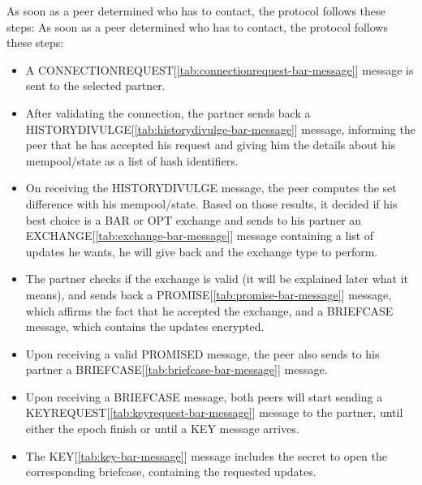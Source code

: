 \documentclass[mscthesis]{usiinfthesis}
\begin{document}
As soon as a peer determined who has to contact, the protocol follows these steps:
As soon as a peer determined who has to contact, the protocol follows these steps:
\begin{itemize}
	\item A CONNECTIONREQUEST[\ref{tab:connectionrequest-bar-message}] message is sent to the selected partner.
	\item After validating the connection, the partner sends back a HISTORYDIVULGE[\ref{tab:historydivulge-bar-message}] message, informing the peer that he has accepted his request and giving him the details about his mempool/state as a list of hash identifiers.
	\item On receiving the HISTORYDIVULGE message, the peer computes the set difference with his mempool/state. Based on those results, it decided if his best choice is a BAR or OPT exchange and sends to his partner an EXCHANGE[\ref{tab:exchange-bar-message}] message containing a list of updates he wants, he will give back and the exchange type to perform.
	\item The partner checks if the exchange is valid (it will be explained later what it means), and sends back a PROMISE[\ref{tab:promise-bar-message}] message, which affirms the fact that he accepted the exchange, and a BRIEFCASE message, which contains the updates encrypted.
	\item Upon receiving a valid PROMISED message, the peer also sends to his partner a BRIEFCASE[\ref{tab:briefcase-bar-message}] message.
	\item Upon receiving a BRIEFCASE message, both peers will start sending a KEYREQUEST[\ref{tab:keyrequest-bar-message}] message to the partner, until either the epoch finish or until a KEY message arrives.
	\item The KEY[\ref{tab:key-bar-message}] message includes the secret to open the corresponding briefcase, containing the requested updates.
\end{itemize}
\end{document}
